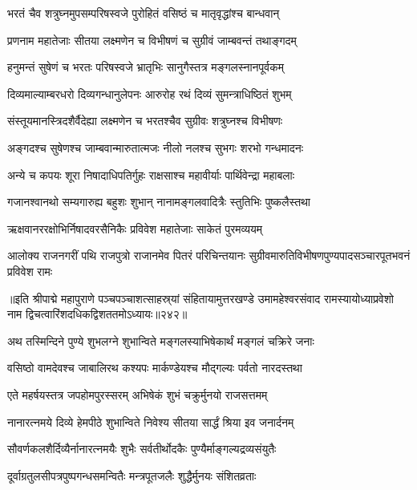 \twolineshloka
{भरतं चैव शत्रुघ्नमुपसम्परिषस्वजे}
{पुरोहितं वसिष्ठं च मातृवृद्धांश्च बान्धवान्}%

\twolineshloka
{प्रणनाम महातेजाः सीतया लक्ष्मणेन च}
{विभीषणं च सुग्रीवं जाम्बवन्तं तथाङ्गदम्}%

\twolineshloka
{हनुमन्तं सुषेणं च भरतः परिषस्वजे}
{भ्रातृभिः सानुगैस्तत्र मङ्गलस्नानपूर्वकम्}%

\twolineshloka
{दिव्यमाल्याम्बरधरो दिव्यगन्धानुलेपनः}
{आरुरोह रथं दिव्यं सुमन्त्राधिष्ठितं शुभम्}%

\twolineshloka
{संस्तूयमानस्त्रिदशैर्वैदेह्या लक्ष्मणेन च}
{भरतश्चैव सुग्रीवः शत्रुघ्नश्च विभीषणः}%

\twolineshloka
{अङ्गदश्च सुषेणश्च जाम्बवान्मारुतात्मजः}
{नीलो नलश्च सुभगः शरभो गन्धमादनः}%

\twolineshloka
{अन्ये च कपयः शूरा निषादाधिपतिर्गुहः}
{राक्षसाश्च महावीर्याः पार्थिवेन्द्रा महाबलाः}%

\twolineshloka
{गजानश्वानथो सम्यगारुह्य बहुशः शुभान्}
{नानामङ्गलवादित्रैः स्तुतिभिः पुष्कलैस्तथा}%

\twolineshloka
{ऋक्षवानररक्षोभिर्निषादवरसैनिकैः}
{प्रविवेश महातेजाः साकेतं पुरमव्ययम्}%

\twolineshloka
{आलोक्य राजनगरीं पथि राजपुत्रो राजानमेव पितरं परिचिन्तयानः}
{सुग्रीवमारुतिविभीषणपुण्यपादसञ्चारपूतभवनं प्रविवेश रामः}%

{॥इति श्रीपाद्मे महापुराणे पञ्चपञ्चाशत्साहस्र्यां संहितायामुत्तरखण्डे उमामहेश्वरसंवाद रामस्यायोध्याप्रवेशो नाम द्विचत्वारिंशदधिकद्विशततमोऽध्यायः॥२४२॥}



\twolineshloka
{अथ तस्मिन्दिने पुण्ये शुभलग्ने शुभान्विते}
{मङ्गलस्याभिषेकार्थं मङ्गलं चक्रिरे जनाः}%

\twolineshloka
{वसिष्ठो वामदेवश्च जाबालिरथ कश्यपः}
{मार्कण्डेयश्च मौद्गल्यः पर्वतो नारदस्तथा}%

\twolineshloka
{एते महर्षयस्तत्र जपहोमपुरस्सरम्}
{अभिषेकं शुभं चक्रुर्मुनयो राजसत्तमम्}%

\twolineshloka
{नानारत्नमये दिव्ये हेमपीठे शुभान्विते}
{निवेश्य सीतया सार्द्धं श्रिया इव जनार्दनम्}%

\twolineshloka
{सौवर्णकलशैर्दिव्यैर्नानारत्नमयैः शुभैः}
{सर्वतीर्थोदकैः पुण्यैर्माङ्गल्यद्रव्यसंयुतैः}%

\twolineshloka
{दूर्वाग्रतुलसीपत्रपुष्पगन्धसमन्वितैः}
{मन्त्रपूतजलैः शुद्धैर्मुनयः संशितव्रताः}%

